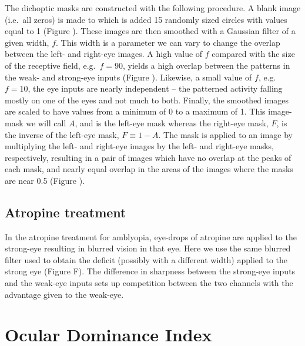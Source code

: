 \documentclass[
  letterpaper,
  number]{elsarticle}
\begin{document}
The dichoptic masks are constructed with the following procedure. A
blank image (i.e.~all zeros) is made to which is added 15 randomly sized
circles with values equal to 1 (Figure \citep{fig:dichopic_blob}). These
images are then smoothed with a Gaussian filter of a given width, \(f\).
This width is a parameter we can vary to change the overlap between the
left- and right-eye images. A high value of \(f\) compared with the size
of the receptive field, e.g.~\(f=90\), yields a high overlap between the
patterns in the weak- and strong-eye inputs (Figure
\citep{fig:dichopic_filter_size}). Likewise, a small value of \(f\),
e.g.~\(f=10\), the eye inputs are nearly independent -- the patterned
activity falling mostly on one of the eyes and not much to both.
Finally, the smoothed images are scaled to have values from a minimum of
0 to a maximum of 1. This image-mask we will call \(A\), and is the
left-eye mask whereas the right-eye mask, \(F\), is the inverse of the
left-eye mask, \(F\equiv 1-A\). The mask is applied to an image by
multiplying the left- and right-eye images by the left- and right-eye
masks, respectively, resulting in a pair of images which have no overlap
at the peaks of each mask, and nearly equal overlap in the areas of the
images where the masks are near 0.5 (Figure
\citep{fig:dichopic_filter_image}).

\hypertarget{atropine-treatment}{%
\section{Atropine treatment}\label{atropine-treatment}}

In the atropine treatment for amblyopia\citep{glaser2002randomized},
eye-drops of atropine are applied to the strong-eye resulting in blurred
vision in that eye. Here we use the same blurred filter used to obtain
the deficit (possibly with a different width) applied to the strong eye
(Figure \citep{fig:input} F). The difference in sharpness between the
strong-eye inputs and the weak-eye inputs sets up competition between
the two channels with the advantage given to the weak-eye.

\hypertarget{ocular-dominance-index}{%
\chapter{Ocular Dominance Index}\label{ocular-dominance-index}}
\end{document}
